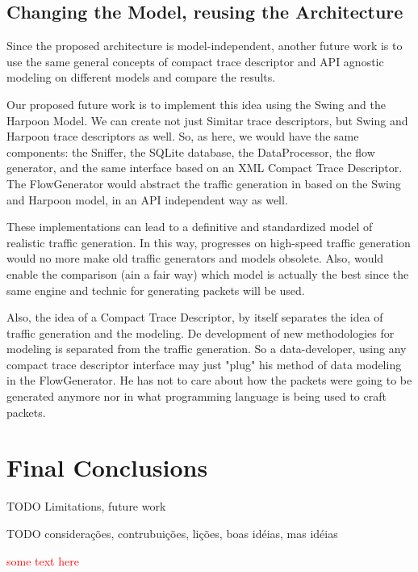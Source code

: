 \subsection{Changing the Model, reusing the Architecture}

Since the proposed architecture is model-independent, another future work is to use the same general concepts of compact trace descriptor and API agnostic modeling on different models and compare the results.

Our proposed future work is to implement this idea using the Swing\cite{swing-paper} and the Harpoon Model\cite{harpoon-paper}.  We can create not just Simitar trace descriptors, but Swing and Harpoon trace descriptors as well. So, as here, we would have the same components: the Sniffer, the SQLite database, the DataProcessor, the flow generator, and the same interface based on an XML Compact Trace Descriptor. The FlowGenerator would abstract the traffic generation in based on the Swing and Harpoon model, in an API independent way as well. 

These implementations can lead to a definitive and standardized model of realistic traffic generation. In this way, progresses on high-speed traffic generation would no more make old traffic generators and models obsolete. Also, would enable the comparison (ain a fair way) which model is actually the best since the same engine and technic for generating packets will be used.

Also, the idea of a Compact Trace Descriptor, by itself separates the idea of traffic generation and the modeling. De development of new methodologies for modeling is  separated from the traffic generation. So a data-developer, using any compact trace descriptor interface may just "plug" his method of data modeling in the FlowGenerator. He has not to care about how the packets were going to be generated anymore nor in what programming language is being used to craft packets.


\section{Final Conclusions}



TODO Limitations, future work

TODO considerações, contrubuições, lições, boas idéias, mas idéias



\textcolor{red}{some text here}







